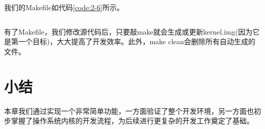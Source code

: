\documentclass[main.tex]{subfiles}
\begin{document}
\begin{CJK*}{UTF8}{song}
\par
我们的Makefile如代码\ref{code:2-6}所示。
\begin{code}
\label{code:2-6}
\inputminted[linenos,numbersep=5pt,frame=lines,framesep=2mm]{make}{src/chapter02/kernel/Makefile}
\end{code}
有了Makefile，我们修改源代码后，只要敲make就会生成或更新kernel.img(因为它是第一个目标)，大大提高了开发效率。此外，make clean会删除所有自动生成的文件。

\section{小结}
本章我们通过实现一个非常简单功能，一方面验证了整个开发环境，另一方面也初步掌握了操作系统内核的开发流程，为后续进行更复杂的开发工作奠定了基础。

\clearpage
\ifxetex\else\end{CJK*}\fi
\end{document}
